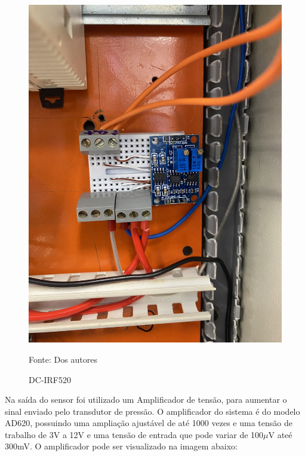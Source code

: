 \begin{figure}[H]
    \centering\footnotesize
    \caption{DC-IRF520}
    \begin{center}
        \includegraphics[scale=0.1]{imagens/amplificador.jpg}
    \end{center}
    \label{fig:driver}
    \par Fonte: Dos autores
\end{figure}

Na saída do sensor foi utilizado um Amplificador de tensão, para aumentar o sinal enviado pelo transdutor de pressão. O amplificador do sistema é do modelo AD620, possuindo uma ampliação ajustável de até 1000 vezes e uma tensão de trabalho de 3V a 12V e uma tensão de entrada que pode variar de 100$\mu$V ateé 300mV. O amplificador pode ser visualizado na imagem abaixo:

